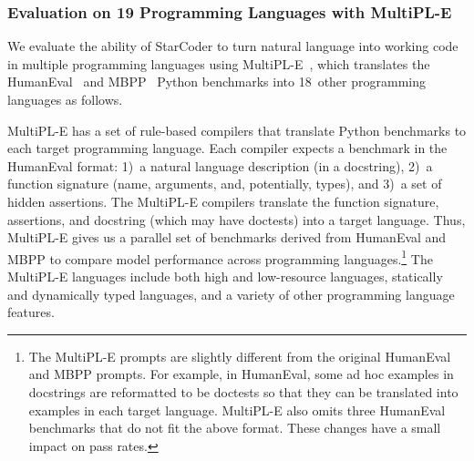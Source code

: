 \documentclass[10pt]{article} %
\begin{document}
\subsubsection{Evaluation on 19 Programming Languages with MultiPL-E}\label{sec:text-to-code}

We evaluate the ability of StarCoder to turn natural language into working code in multiple programming languages using MultiPL-E~\citep{cassano2022multiple},
which translates the HumanEval~\citep{chen2021codex} and MBPP~\citep{austin2021program} Python benchmarks into 18~other programming languages as follows. 


MultiPL-E has a set of rule-based compilers that translate Python benchmarks to each target programming language. Each compiler expects a benchmark in the HumanEval format:  1)~a natural language description (in a docstring), 2)~a function signature (name, arguments, and, potentially, types), and 3)~a set of hidden assertions. The MultiPL-E compilers translate the function signature, assertions, and docstring (which may have doctests) into a target language. Thus, MultiPL-E gives us a parallel set of benchmarks derived from HumanEval and MBPP to compare model performance across programming languages.\footnote{The MultiPL-E prompts are slightly different from the original HumanEval and MBPP prompts. For example, in HumanEval, some ad hoc examples in docstrings are reformatted to be doctests so that they can be translated into examples in each target language. MultiPL-E also omits three HumanEval benchmarks that do not fit the above format. These changes have a small impact on  pass rates.} 
The MultiPL-E languages include both high and low-resource languages, statically and dynamically typed languages, and  a variety of other programming language features.


\begin{table}
\centering
\resizebox{\linewidth}{!}{}
\caption{Comparing StarCoder to multi-language open-access (e.g., CodeGen-16B-Multi) and closed-access models (e.g., code-cushman-001) on 19~programming languages. We report pass@1 on HumanEval~\citep{chen2021codex}, which we translate from Python to the other languages using MultiPL-E~\citep{cassano2022multiple}.}
\label{tab:multiple}
\end{table}
\end{document}
